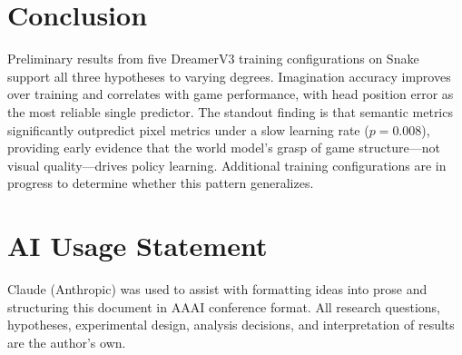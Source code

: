 \documentclass[letterpaper]{article}
\begin{document}
\section{Conclusion}

Preliminary results from five DreamerV3 training configurations on Snake support all three hypotheses to varying degrees. Imagination accuracy improves over training and correlates with game performance, with head position error as the most reliable single predictor. The standout finding is that semantic metrics significantly outpredict pixel metrics under a slow learning rate ($p = 0.008$), providing early evidence that the world model's grasp of game structure---not visual quality---drives policy learning. Additional training configurations are in progress to determine whether this pattern generalizes.

\section*{AI Usage Statement}

Claude (Anthropic) was used to assist with formatting ideas into prose and structuring this document in AAAI conference format. All research questions, hypotheses, experimental design, analysis decisions, and interpretation of results are the author's own.


\end{document}
